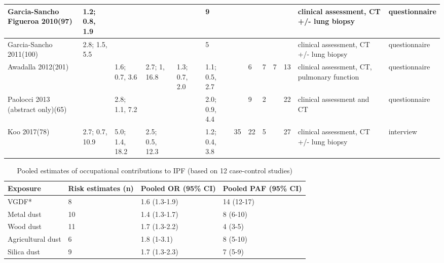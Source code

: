 \documentclass[a4paper,10pt]{article}
\begin{document}
\begin{table}[htbp]
\begin{tabular}{|p{1.5cm}|p{0.5cm}p{0.5cm}p{0.5cm}p{0.5cm}p{0.5cm}|p{0.5cm}p{0.5cm}p{0.5cm}p{0.5cm}p{0.5cm}|p{2.5cm}|p{2cm}|}
\hline
        Garcia-Sancho Figueroa 2010(97)\cite{Garcia-SanchoFigueroa2010}   & 1.2; 0.8, 1.9   &               &               &               & 9  &    &    &    & & & clinical assessment, CT +/- lung biopsy                  & questionnaire                         \\
\hline
        Garcia-Sancho 2011(100)\cite{Garcia-Sancho2011}           & 2.8; 1.5, 5.5   &               &               &               & 5  &    &    &    & & & clinical assessment, CT +/- lung biopsy                  & questionnaire                         \\
\hline
        Awadalla 2012(201)\cite{Awadalla2012}                &               & 1.6; 0.7, 3.6   & 2.7; 1, 16.8    & 1.3; 0.7, 2.0   & 1.1; 0.5, 2.7 &   & 6  & 7  & 7  & 13 & clinical assessment, CT, pulmonary function              & questionnaire                         \\
\hline
        Paolocci 2013 (abstract only)(65)\cite{Paolocci2013} &               & 2.8; 1.1, 7.2   &               &               & 2.0; 0.9, 4.4 &   & 9  & 2  &    & 22 & clinical assessment and CT                               & questionnaire                         \\
\hline
        Koo 2017(78)\cite{Koo2017}                      & 2.7; 0.7, 10.9  & 5.0; 1.4, 18.2  & 2.5; 0.5, 12.3  & & 1.2; 0.4, 3.8              & 35 & 22 & 5  &    & 27 & clinical assessment, CT +/- lung biopsy                  & interview       \\        
\bottomrule             
\end{tabular}
\end{table}

\begin{table}[htbp]\centering
\caption{Pooled estimates of occupational contributions to IPF (based on 12 case-control studies)}
\label{metatable2}
\begin{tabular}{llll}
\toprule
\textbf{Exposure}          & \textbf{Risk estimates (n)} & \textbf{Pooled OR (95\% CI)} & \textbf{Pooled PAF (95\% CI)} \\
\midrule
VGDF*             & 8                  & 1.6 (1.3-1.9)       & 14 (12-17)           \\
Metal dust        & 10                 & 1.4 (1.3-1.7)       & 8 (6-10)             \\
Wood dust         & 11                 & 1.7 (1.3-2.2)       & 4 (3-5)              \\
Agricultural dust & 6                  & 1.8 (1-3.1)         & 8 (5-10)             \\
Silica dust       & 9                  & 1.7 (1.3-2.3)       & 7 (5-9)              \\
\bottomrule
\end{tabular}
\end{table}


     
     \makeatletter
      \def\@biblabel#1{#1}
      \makeatother

      
      


      
\end{document}
